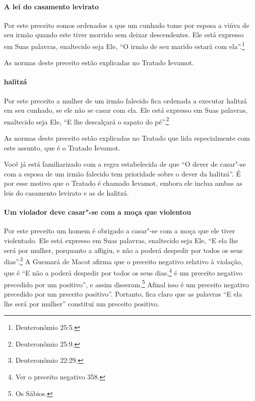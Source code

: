 \begin{multicols}{2}
\paragraph{A lei do casamento levirato\starr{}}

Por este preceito somos ordenados a que um cunhado tome por esposa a
viúva de seu irmão quando este tiver morrido sem deixar descendentes.
Ele está expresso em Suas palavras, enaltecido seja Ele, ``O irmão de
seu marido estará com ela''.\footnote{Deuteronômio 25:5.}

As normas deste preceito estão explicadas no Tratado Ievamot\starr.

\paragraph{halitzá\starr}

Por este preceito a mulher de um irmão falecido fica ordenada a
executar halitzá\starr{} em seu cunhado, se ele não se casar com ela. Ele
está expresso em Suas palavras, enaltecido seja Ele, ``E lhe descalçará
o sapato do pé''.\footnote{Deuteronômio 25:9.}

As normas deste preceito estão explicadas no Tratado que lida
especialmente com este assunto, que é o Tratado Ievamot\starr.

Você já está familiarizado com a regra estabelecida de que ``O dever de
casar"-se com a esposa de um irmão falecido tem prioridade sobre o dever
da halitzá\starr''. É por esse motivo que o Tratado é chamado Ievamot\starr,
embora ele inclua ambas as leis do casamento levirato\starr{} e as de
halitzá\starr.

\paragraph{Um violador deve casar"-se com a moça que violentou}

Por este preceito um homem é obrigado a casar"-se com a moça que ele
tiver violentado. Ele está expresso em Suas palavras, enaltecido seja
Ele, ``E ela lhe será por mulher, porquanto a afligiu, e não a poderá
despedir por todos os seus dias''.\footnote{Deuteronômio 22:29.} A Guemará\starr{} de
Macot\starr{} afirma que o preceito negativo relativo à violação, que é ``E não
a poderá despedir por todos os seus dias,\footnote{Ver o preceito negativo 358.} é um preceito negativo precedido por um positivo'', e assim
disseram.\footnote{Os Sábios.} Afinal isso é um preceito negativo
precedido por um preceito positivo''. Portanto, fica claro que as palavras ``E ela lhe será por mulher'' constitui um preceito positivo.


\end{multicols}

